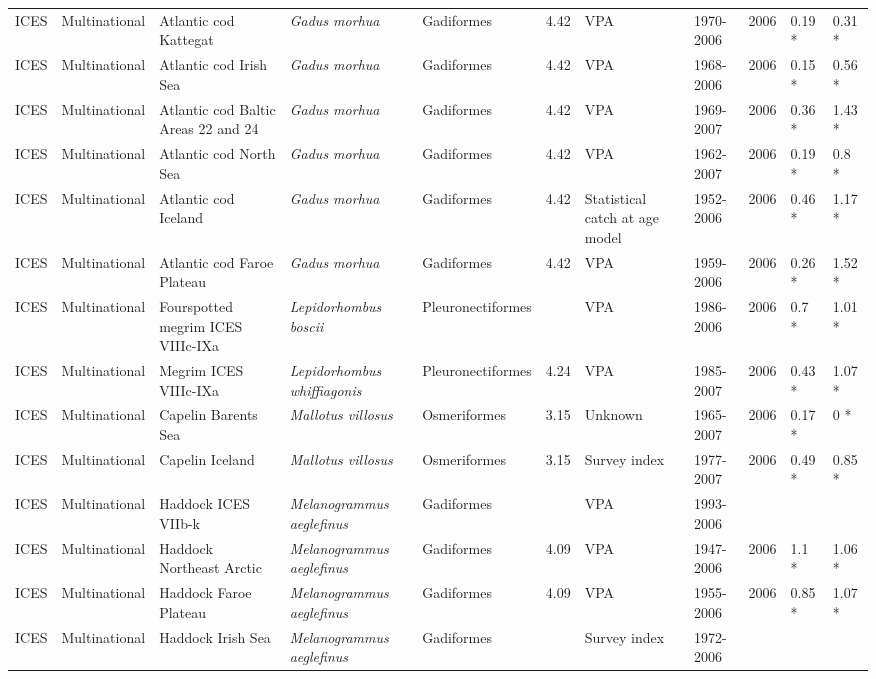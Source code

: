 \begin{longtable}{p{1.5cm}p{1.5cm}p{3cm}p{3cm}p{2.5cm}p{0.9cm}p{1.4cm}p{0.9cm}p{0.9cm}p{0.9cm}p{1cm}}
  ICES & Multinational & Atlantic cod Kattegat & \textit{Gadus morhua} & Gadiformes & 4.42 & VPA & 1970-2006 & 2006 & 0.19 * & 0.31 * \\ 
  ICES & Multinational & Atlantic cod Irish Sea & \textit{Gadus morhua} & Gadiformes & 4.42 & VPA & 1968-2006 & 2006 & 0.15 * & 0.56 * \\ 
  ICES & Multinational & Atlantic cod Baltic Areas 22 and 24 & \textit{Gadus morhua} & Gadiformes & 4.42 & VPA & 1969-2007 & 2006 & 0.36 * & 1.43 * \\ 
  ICES & Multinational & Atlantic cod North Sea & \textit{Gadus morhua} & Gadiformes & 4.42 & VPA & 1962-2007 & 2006 & 0.19 * & 0.8 * \\ 
  ICES & Multinational & Atlantic cod Iceland & \textit{Gadus morhua} & Gadiformes & 4.42 & Statistical catch at age model & 1952-2006 & 2006 & 0.46 * & 1.17 * \\ 
  ICES & Multinational & Atlantic cod Faroe Plateau & \textit{Gadus morhua} & Gadiformes & 4.42 & VPA & 1959-2006 & 2006 & 0.26 * & 1.52 * \\ 
  ICES & Multinational & Fourspotted megrim ICES VIIIc-IXa & \textit{Lepidorhombus boscii} & Pleuronectiformes &  & VPA & 1986-2006 & 2006 & 0.7 * & 1.01 * \\ 
  ICES & Multinational & Megrim ICES VIIIc-IXa & \textit{Lepidorhombus whiffiagonis} & Pleuronectiformes & 4.24 & VPA & 1985-2007 & 2006 & 0.43 * & 1.07 * \\ 
  ICES & Multinational & Capelin Barents Sea & \textit{Mallotus villosus} & Osmeriformes & 3.15 & Unknown & 1965-2007 & 2006 & 0.17 * & 0 * \\ 
  ICES & Multinational & Capelin Iceland & \textit{Mallotus villosus} & Osmeriformes & 3.15 & Survey index & 1977-2007 & 2006 & 0.49 * & 0.85 * \\ 
  ICES & Multinational & Haddock ICES VIIb-k & \textit{Melanogrammus aeglefinus} & Gadiformes &  & VPA & 1993-2006 &  &  &  \\ 
  ICES & Multinational & Haddock Northeast Arctic & \textit{Melanogrammus aeglefinus} & Gadiformes & 4.09 & VPA & 1947-2006 & 2006 & 1.1 * & 1.06 * \\ 
  ICES & Multinational & Haddock Faroe Plateau & \textit{Melanogrammus aeglefinus} & Gadiformes & 4.09 & VPA & 1955-2006 & 2006 & 0.85 * & 1.07 * \\ 
  ICES & Multinational & Haddock Irish Sea & \textit{Melanogrammus aeglefinus} & Gadiformes &  & Survey index & 1972-2006 &  &  &  \\ 

\end{longtable}
